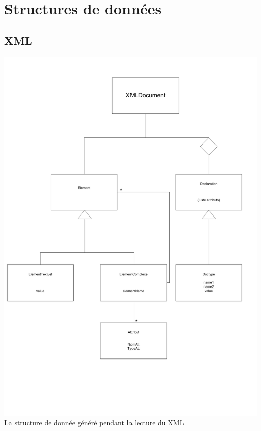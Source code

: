 \section{Structures de données}

    \subsection{XML}
        \includegraphics[width=\textwidth]{img/ClassesXML.pdf}\\
        La structure de donnée généré pendant la lecture du XML
        
